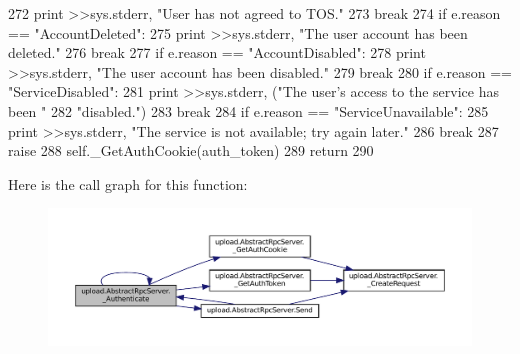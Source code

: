 \begin{DoxyCode}
272           \textcolor{keywordflow}{print} >>sys.stderr, \textcolor{stringliteral}{"User has not agreed to TOS."}
273           \textcolor{keywordflow}{break}
274         \textcolor{keywordflow}{if} e.reason == \textcolor{stringliteral}{"AccountDeleted"}:
275           \textcolor{keywordflow}{print} >>sys.stderr, \textcolor{stringliteral}{"The user account has been deleted."}
276           \textcolor{keywordflow}{break}
277         \textcolor{keywordflow}{if} e.reason == \textcolor{stringliteral}{"AccountDisabled"}:
278           \textcolor{keywordflow}{print} >>sys.stderr, \textcolor{stringliteral}{"The user account has been disabled."}
279           \textcolor{keywordflow}{break}
280         \textcolor{keywordflow}{if} e.reason == \textcolor{stringliteral}{"ServiceDisabled"}:
281           \textcolor{keywordflow}{print} >>sys.stderr, (\textcolor{stringliteral}{"The user's access to the service has been "}
282                                \textcolor{stringliteral}{"disabled."})
283           \textcolor{keywordflow}{break}
284         \textcolor{keywordflow}{if} e.reason == \textcolor{stringliteral}{"ServiceUnavailable"}:
285           \textcolor{keywordflow}{print} >>sys.stderr, \textcolor{stringliteral}{"The service is not available; try again later."}
286           \textcolor{keywordflow}{break}
287         \textcolor{keywordflow}{raise}
288       self.\_GetAuthCookie(auth\_token)
289       \textcolor{keywordflow}{return}
290 
\end{DoxyCode}
Here is the call graph for this function\+:
\nopagebreak
\begin{figure}[H]
\begin{center}
\leavevmode
\includegraphics[width=350pt]{classupload_1_1AbstractRpcServer_a8517a9d90ee2478752a53302f01d868d_cgraph}
\end{center}
\end{figure}
\mbox{\label{classupload_1_1AbstractRpcServer_a1553c79619eec0770932cd4fa325243c}} 

